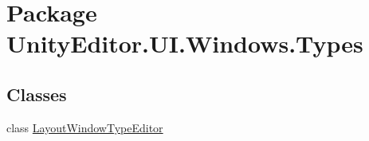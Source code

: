 \hypertarget{namespace_unity_editor_1_1_u_i_1_1_windows_1_1_types}{}\section{Package Unity\+Editor.\+U\+I.\+Windows.\+Types}
\label{namespace_unity_editor_1_1_u_i_1_1_windows_1_1_types}
\subsection*{Classes}
\begin{DoxyCompactItemize}
\item 
class \hyperlink{class_unity_editor_1_1_u_i_1_1_windows_1_1_types_1_1_layout_window_type_editor}{Layout\+Window\+Type\+Editor}
\end{DoxyCompactItemize}
